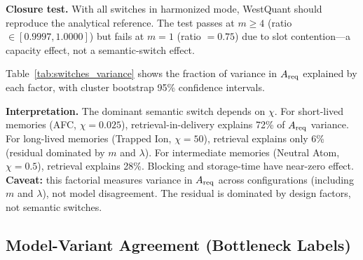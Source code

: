 \documentclass{ams-journal}
\begin{document}
\textbf{Closure test.} With all switches in harmonized mode, WestQuant should reproduce the analytical reference. The test passes at $m \ge 4$ (ratio $\in [0.9997, 1.0000]$) but fails at $m = 1$ (ratio $= 0.75$) due to slot contention---a capacity effect, not a semantic-switch effect.

Table~\ref{tab:switches_variance} shows the fraction of variance in $A_{\rm req}$ explained by each factor, with cluster bootstrap 95\% confidence intervals.

\begin{table}[htbp]
\centering
\caption{Fraction of variance in $A_{\rm req}$ explained by each semantic switch, per family. Cluster bootstrap 95\% CI in brackets. The dominant switch depends on the $\chi$ regime: retrieval-in-delivery dominates for short-lived memories ($\chi = 0.025$), generation mode dominates for long-lived memories ($\chi = 50$).}
\label{tab:switches_variance}
\setlength{\tabcolsep}{4pt}
\end{table}

\textbf{Interpretation.} The dominant semantic switch depends on $\chi$. For short-lived memories (AFC, $\chi = 0.025$), retrieval-in-delivery explains 72\% of $A_{\rm req}$ variance. For long-lived memories (Trapped Ion, $\chi = 50$), retrieval explains only 6\% (residual dominated by $m$ and $\lambda$). For intermediate memories (Neutral Atom, $\chi = 0.5$), retrieval explains 28\%. Blocking and storage-time have near-zero effect. \textbf{Caveat:} this factorial measures variance in $A_{\rm req}$ across configurations (including $m$ and $\lambda$), not model disagreement. The residual is dominated by design factors, not semantic switches.

\subsection{Model-Variant Agreement (Bottleneck Labels)}
\end{document}
